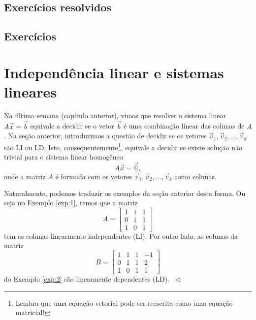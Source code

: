 \subsection*{Exercícios resolvidos}

\construirExeresol

\subsection*{Exercícios}

\construirExer


\section{Independência linear e sistemas lineares}

Na última semana (capítulo anterior), vimos que resolver o sistema linear $A \vec{x} = \vec{b}$ equivale a decidir se o vetor $\vec{b}$ é uma combinação linear das colunas de $A$. Na seção anterior, introduzimos a questão de decidir se os vetores $\vec{v}_1, \vec{v}_2, \dots, \vec{v}_k$ são LI ou LD. Isto, consequentemente\footnote{Lembra que uma equação vetorial pode ser reescrita como uma equação matricial!}, equivale a decidir se existe solução não trivial para o sistema linear homogêneo
\begin{equation}
A \vec{x} = \vec{0},
\end{equation} onde a matriz $A$ é formada com os vetores $\vec{v}_1, \vec{v}_2, \dots, \vec{v}_k$ como colunas.

\begin{ex}
Naturalmente, podemos traduzir os exemplos da seção anterior desta forma. Ou seja no Exemplo \ref{exp:1}, temos que a matriz
\begin{equation}
A = \left[
  \begin{array}{ccc}
    1 & 1 & 1  \\
    0 & 1 & 1   \\
    1 & 0 & 1 
    \end{array}
\right]
\end{equation} tem as colunas linearmente independentes (LI). Por outro lado, as colunas da matriz
\begin{equation}
B = \left[
  \begin{array}{cccc}
    1 & 1 & 1 & -1 \\
    0 & 1 & 1 & 2  \\
    1 & 0 & 1 & 1 
  \end{array}
\right]
\end{equation} do Exemplo \ref{exp:2} são linearmente dependentes (LD). $\ \lhd$
\end{ex}

